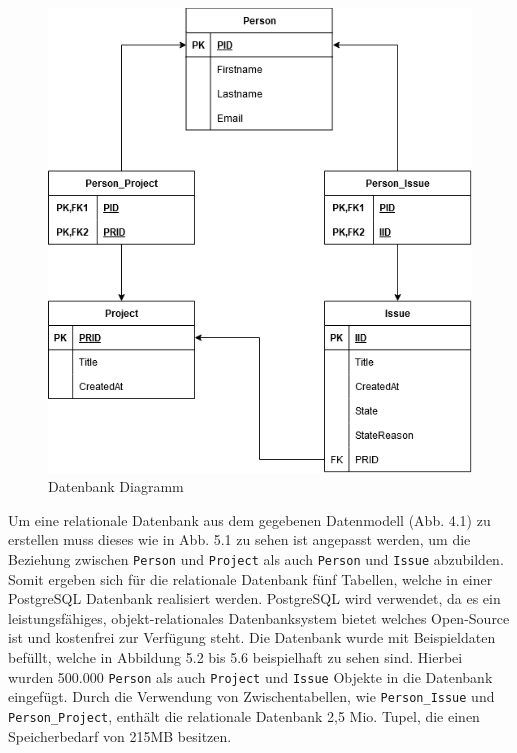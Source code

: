 \begin{figure}[H]
	\centering
	\includegraphics[scale=0.6]{Illustrations/table_diagram.png}
	\caption{Datenbank Diagramm}
\end{figure}
\newpage
\noindent
Um eine relationale Datenbank aus dem gegebenen Datenmodell (Abb. 4.1) zu erstellen muss dieses wie in Abb. 5.1 zu sehen ist angepasst werden, um die Beziehung zwischen \texttt{Person} und \texttt{Project} als auch \texttt{Person} und \texttt{Issue} abzubilden. Somit ergeben sich für die relationale Datenbank fünf Tabellen, welche in einer PostgreSQL Datenbank realisiert werden. PostgreSQL wird verwendet, da es ein leistungsfähiges, objekt-relationales Datenbanksystem bietet welches Open-Source ist und kostenfrei zur Verfügung steht. Die Datenbank wurde mit Beispieldaten befüllt, welche in Abbildung 5.2 bis 5.6 beispielhaft zu sehen sind. Hierbei wurden 500.000 \texttt{Person} als auch \texttt{Project} und \texttt{Issue} Objekte in die Datenbank eingefügt. Durch die Verwendung von Zwischentabellen, wie \texttt{Person\_Issue} und \texttt{Person\_Project}, enthält die relationale Datenbank 2,5 Mio. Tupel, die einen Speicherbedarf von 215MB besitzen. 

